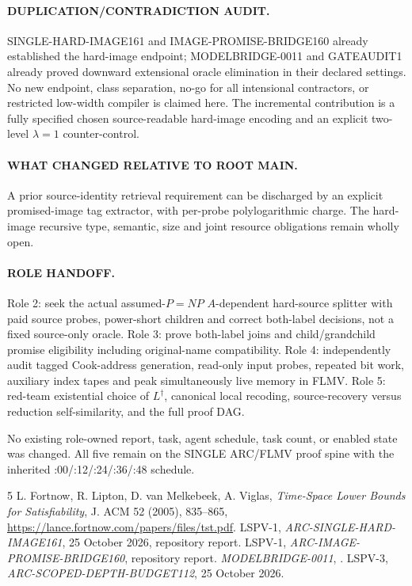 \documentclass[11pt]{article}
\begin{document}
\paragraph{DUPLICATION/CONTRADICTION AUDIT.}
SINGLE-HARD-IMAGE161 and IMAGE-PROMISE-BRIDGE160 already
established the hard-image endpoint; MODELBRIDGE-0011 and
GATEAUDIT1 already proved downward extensional oracle
elimination in their declared settings. No new endpoint,
class separation, no-go for all intensional contractors, or
restricted low-width compiler is claimed here.
The incremental contribution is a fully specified chosen
source-readable hard-image encoding and an explicit
two-level $\lambda=1$ counter-control.

\paragraph{WHAT CHANGED RELATIVE TO ROOT MAIN.}
A prior source-identity retrieval requirement can be discharged
by an explicit promised-image tag extractor, with per-probe
polylogarithmic charge. The hard-image recursive type, semantic,
size and joint resource obligations remain wholly open.

\paragraph{ROLE HANDOFF.}
Role 2: seek the actual assumed-$P=NP$ $A$-dependent hard-source
splitter with paid source probes, power-short children and
correct both-label decisions, not a fixed source-only oracle.
Role 3: prove both-label joins and child/grandchild promise
eligibility including original-name compatibility.
Role 4: independently audit tagged Cook-address generation,
read-only input probes, repeated bit work, auxiliary index
tapes and peak simultaneously live memory in FLMV.
Role 5: red-team existential choice of $L^\dagger$,
canonical local recoding, source-recovery versus reduction
self-similarity, and the full proof DAG.

No existing role-owned report, task, agent schedule, task
count, or enabled state was changed. All five remain on
the SINGLE ARC/FLMV proof spine with the inherited
:00/:12/:24/:36/:48 schedule.

\begin{thebibliography}{5}
 L. Fortnow, R. Lipton, D. van Melkebeek, A. Viglas,
\emph{Time-Space Lower Bounds for Satisfiability},
J. ACM 52 (2005), 835--865,
\url{https://lance.fortnow.com/papers/files/tst.pdf}.
 LSPV-1, \emph{ARC-SINGLE-HARD-IMAGE161},
25 October 2026, repository report.
 LSPV-1,
\emph{ARC-IMAGE-PROMISE-BRIDGE160}, repository report.
 \emph{MODELBRIDGE-0011},
.
 LSPV-3, \emph{ARC-SCOPED-DEPTH-BUDGET112},
25 October 2026.
\end{thebibliography}
\end{document}
